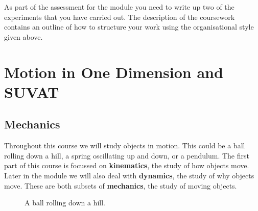\documentclass[a4paper,12pt]{book}
\begin{document}
As part of the assessment for the module you need to write up two of the experiments that you have carried out. The description of the coursework contains an outline of how to structure your work using the organisational style given above.


\chapter{Motion in One Dimension and SUVAT}
\label{sec: motion in 1D}
\section{Mechanics}
Throughout this course we will study objects in motion. This could be a ball rolling down a hill, a spring oscillating up and down, or a pendulum. The first part of this course is focussed on \textbf{kinematics}, the study of how objects move. Later in the module we will also deal with \textbf{dynamics}, the study of why objects move. These are both subsets of \textbf{mechanics}, the study of moving objects. \\


\begin{figure}[ht]
    \centering
    
    {\displaymathother
}
    \caption{A ball rolling down a hill.}
    \label{fig: ball on a hill}
\end{figure}
\end{document}
